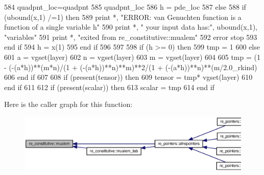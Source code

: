 \begin{DoxyCode}
584         quadpnt\_loc=quadpnt
585         quadpnt\_loc%
586         h = pde\_loc%
587       \textcolor{keywordflow}{else}
588         \textcolor{keywordflow}{if} (ubound(x,1) /=1) \textcolor{keywordflow}{then}
589           print *, \textcolor{stringliteral}{"ERROR: van Genuchten function is a function of a single variable h"}
590           print *, \textcolor{stringliteral}{"       your input data has:"}, ubound(x,1), \textcolor{stringliteral}{"variables"}
591           print *, \textcolor{stringliteral}{"exited from re\_constitutive::mualem"}
592           error stop
593 \textcolor{keywordflow}{        end if}
594         h = x(1)
595 \textcolor{keywordflow}{      end if}
596       
597       
598       \textcolor{keywordflow}{if} (h >= 0) \textcolor{keywordflow}{then}
599         tmp = 1
600       \textcolor{keywordflow}{else}
601         a = vgset(layer)%
602         n = vgset(layer)%
603         m = vgset(layer)%
604 
605         tmp =  (1 - (-(a*h))**(m*n)/(1 + (-(a*h))**n)**m)**2/(1 + (-(a*h))**n)*\textcolor{comment}{*(m/2.0\_rkind)}
606 \textcolor{comment}{}\textcolor{keywordflow}{      end if}
607         
608       \textcolor{keywordflow}{if} (\textcolor{keyword}{present}(tensor)) \textcolor{keywordflow}{then}
609         tensor = tmp* vgset(layer)%
610 \textcolor{keywordflow}{      end if}
611 
612       \textcolor{keywordflow}{if} (\textcolor{keyword}{present}(scalar)) \textcolor{keywordflow}{then}
613         scalar = tmp
614 \textcolor{keywordflow}{      end if}
\end{DoxyCode}


Here is the caller graph for this function\+:\nopagebreak
\begin{figure}[H]
\begin{center}
\leavevmode
\includegraphics[width=350pt]{namespacere__constitutive_a350f561bf6541e41a24b80a1dafdfad0_icgraph}
\end{center}
\end{figure}


